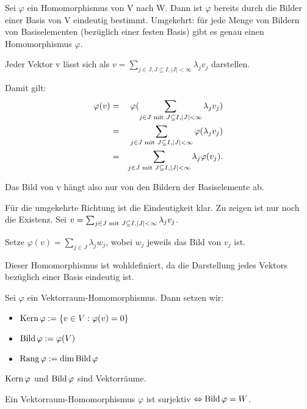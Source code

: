 \documentclass[10pt]{scrbook}
\begin{document}
\begin{Sa}
Sei $\varphi$ ein Homomorphismus von V nach W. Dann ist $\varphi$ bereits durch die Bilder einer Basis von V eindeutig bestimmt. Umgekehrt: für jede Menge von Bildern von Basiselementen (bezüglich einer festen Basis) gibt es genau einen Homomorphismus $\varphi$.\label{sa:vr_hom_basis}
\end{Sa}
\begin{bew}
Jeder Vektor v lässt sich als $v=\sum_{j\in J, J\subseteq I, \left|J\right|<\infty}{\lambda_j v_j}$ darstellen.

Damit gilt: 
\begin{eqnarray*}
\varphi(v) & = & \varphi(\sum_{j\in J\textnormal{ mit } J\subseteq I, \left|J\right|<\infty}{\lambda_j v_j}) \\
& = & \sum_{j\in J\textnormal{ mit } J\subseteq I, \left|J\right|<\infty}{\varphi(\lambda_j v_j)} \\
& = & \sum_{j\in J\textnormal{ mit } J\subseteq I, \left|J\right|<\infty}{\lambda_j \varphi(v_j)}.
\end{eqnarray*}

Das Bild von v hängt also nur von den Bildern der Basiselemente ab.

Für die umgekehrte Richtung ist die Eindeutigkeit klar. Zu zeigen ist nur noch die Existenz. Sei $v=\sum_{j\in J\textnormal{ mit } J\subseteq I, \left|J\right|<\infty}{\lambda_j v_j}$.

Setze $\varphi(v)=\sum_{j\in J}\lambda_j {w_j}$, wobei $w_j$ jeweils das Bild von $v_j$ ist.

Dieser Homomorphismus ist wohldefiniert, da die Darstellung jedes Vektors bezüglich einer Basis eindeutig ist.
\end{bew}

\begin{Def}
Sei $\varphi$ ein Vektorraum-Homomorphismus. Dann setzen wir:
\begin{itemize}
	\item $\operatorname{Kern} \varphi:=\left\{v\in V: \varphi(v)=0\right\}$
	\item $\operatorname{Bild} \varphi:=\varphi(V)$
	\item $\operatorname{Rang} \varphi:=\dim \operatorname{Bild} \varphi$
\end{itemize}
\end{Def}

\begin{Bem}
$\operatorname{Kern} \varphi$ und $\operatorname{Bild} \varphi$ sind Vektorräume.
\end{Bem}

\begin{Le}
Ein Vektorraum-Homomorphismus $\varphi$ ist surjektiv $\Leftrightarrow \operatorname{Bild} \varphi=W$. 
\end{Le}
\end{document}
